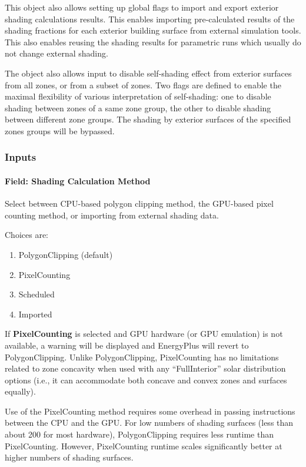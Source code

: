 This object also allows setting up global flags to import and export exterior shading calculations results. This enables importing pre-calculated results of the shading fractions for each exterior building surface from external simulation tools. This also enables reusing the shading results for parametric runs which usually do not change external shading.

The object also allows input to disable self-shading effect from exterior surfaces from all zones, or from a subset of zones. Two flags are defined to enable the maximal flexibility of various interpretation of self-shading: one to disable shading between zones of a same zone group, the other to disable shading between different zone groups. The shading by exterior surfaces of the specified zones groups will be bypassed.

\subsubsection{Inputs}\label{inputs-10-019}

\paragraph{Field: Shading Calculation Method}\label{field-shading-calculation-method}

Select between CPU-based polygon clipping method, the GPU-based pixel counting method, or importing from external shading data.

Choices are:
\begin{enumerate}
    \item PolygonClipping (default)
    \item PixelCounting
    \item Scheduled
    \item Imported
\end{enumerate}

If \textbf{PixelCounting} is selected and GPU hardware (or GPU emulation) is not available, a warning will be displayed and EnergyPlus will revert to PolygonClipping. Unlike PolygonClipping, PixelCounting has no limitations related to zone concavity when used with any ``FullInterior'' solar distribution options (i.e., it can accommodate both concave and convex zones and surfaces equally).

Use of the PixelCounting method requires some overhead in passing instructions between the CPU and the GPU. For low numbers of shading surfaces (less than about 200 for most hardware), PolygonClipping requires less runtime than PixelCounting. However, PixelCounting runtime scales significantly better at higher numbers of shading surfaces.

